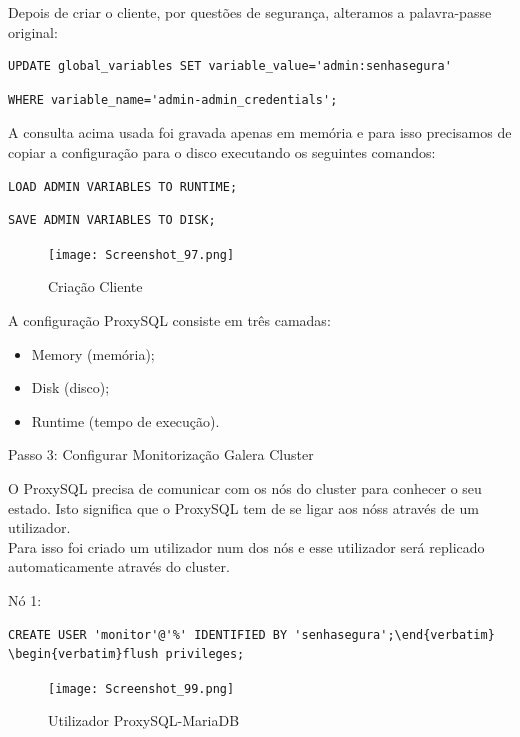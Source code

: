 Depois de criar o cliente, por questões de segurança, alteramos a palavra-passe original:

\begin{verbatim}UPDATE global_variables SET variable_value='admin:senhasegura' \end{verbatim}
\begin{verbatim}WHERE variable_name='admin-admin_credentials';\end{verbatim}

\newpage
A consulta acima usada foi gravada apenas em memória e para isso precisamos de copiar a configuração para o disco executando os seguintes comandos: 

\begin{verbatim}LOAD ADMIN VARIABLES TO RUNTIME;\end{verbatim}

\begin{verbatim}SAVE ADMIN VARIABLES TO DISK;\end{verbatim}

\begin{figure}[H]
\center
\texttt{[image: Screenshot\_97.png]}
\caption{Criação Cliente}
\end{figure}

\hfill \break
\indent A configuração ProxySQL consiste em três camadas:
\begin{itemize}
    \item Memory (memória);
    \item Disk (disco);
    \item Runtime (tempo de execução).
\end{itemize}

\newpage
\indent Passo 3: Configurar Monitorização Galera Cluster

\hfill \break
\indent O ProxySQL precisa de comunicar com os nós do cluster para conhecer o seu estado. Isto significa que o ProxySQL tem de se ligar aos nóss através de um utilizador.\\
Para isso foi criado um utilizador num dos nós e esse utilizador será replicado automaticamente através do cluster.

\hfill \break
\indent Nó 1:
\begin{verbatim}CREATE USER 'monitor'@'%' IDENTIFIED BY 'senhasegura';\end{verbatim}
\begin{verbatim}flush privileges;\end{verbatim}

\begin{figure}[H]
\center
\texttt{[image: Screenshot\_99.png]}
\caption{Utilizador ProxySQL-MariaDB}
\end{figure}


